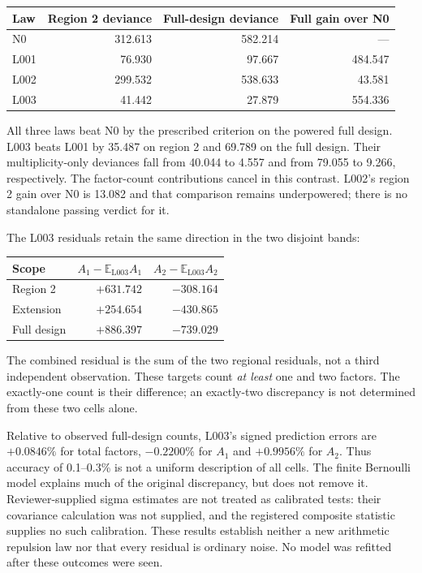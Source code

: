 \documentclass[11pt,a4paper]{article}
\newcommand{\E}{\mathbb{E}}
\begin{document}
\begin{center}\small
\begin{tabular}{lrrr}
\toprule
Law & Region 2 deviance & Full-design deviance & Full gain over N0\\
\midrule
N0 & 312.613 & 582.214 & ---\\
L001 & 76.930 & 97.667 & 484.547\\
L002 & 299.532 & 538.633 & 43.581\\
L003 & 41.442 & 27.879 & 554.336\\
\bottomrule
\end{tabular}
\end{center}

All three laws beat N0 by the prescribed criterion on the powered full
design. L003 beats L001 by 35.487 on region 2 and 69.789 on the full design.
Their multiplicity-only deviances fall from 40.044 to 4.557 and from 79.055
to 9.266, respectively. The factor-count contributions cancel in this
contrast. L002's region 2 gain over N0 is 13.082 and that comparison remains
underpowered; there is no standalone passing verdict for it.

The L003 residuals retain the same direction in the two disjoint bands:
\begin{center}\small
\begin{tabular}{lrr}
\toprule
Scope & $A_1-\E_{\mathrm{L003}}A_1$ & $A_2-\E_{\mathrm{L003}}A_2$\\
\midrule
Region 2 & $+631.742$ & $-308.164$\\
Extension & $+254.654$ & $-430.865$\\
Full design & $+886.397$ & $-739.029$\\
\bottomrule
\end{tabular}
\end{center}
The combined residual is the sum of the two regional residuals, not a third
independent observation. These targets count \emph{at least} one and two
factors. The exactly-one count is their difference; an exactly-two
discrepancy is not determined from these two cells alone.

Relative to observed full-design counts, L003's signed prediction errors
are $+0.0846\%$ for total factors, $-0.2200\%$ for $A_1$ and $+0.9956\%$
for $A_2$. Thus accuracy of 0.1--0.3\% is not a uniform description of all
cells. The finite Bernoulli model explains much of the original discrepancy,
but does not remove it. Reviewer-supplied sigma estimates are not treated
as calibrated tests: their covariance calculation was not supplied, and the
registered composite statistic supplies no such calibration. These results
establish neither a new arithmetic repulsion law nor that every residual
is ordinary noise. No model was refitted after these outcomes were seen.
\end{document}
